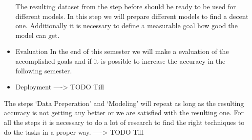 \begin{itemize}
 The resulting dataset from the step before should be ready to be used for different models. In this step we will prepare different models to find a decent one. Additionally it is necessary to define a measurable goal how good the model can get.   
\item Evaluation \newline
In the end of this semester we will make a evaluation of the accomplished goals and if it is possible to increase the accuracy in the following semester.  
\item Deployment \newline
----> TODO Till
\end{itemize}

The steps `Data Preperation' and `Modeling' will repeat as long as the resulting accuracy is not getting any better or we are satisfied with the resulting one. For all the steps it is necessary to do a lot of research to find the right techniques to do the tasks in a proper way. 
----> TODO Till